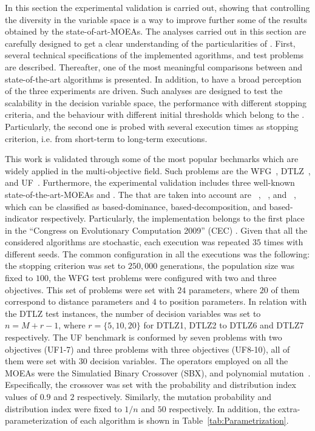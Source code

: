 In this section the experimental validation is carried out, showing that controlling the diversity in the variable space is a way to improve further some of the results obtained by the state-of-art-MOEAs.
%
The analyses carried out in this section are carefully designed to get a clear understanding of the particularities of \VSDMOEA{}.
%
First, several technical specifications of the implemented agorithms, and test problems are described.
%
Thereafter, one of the most meaningful comparisons between \VSDMOEA{} and state-of-the-art algorithms is presented.
%
In addition, to have a broad perception of the \VSDMOEA{} three experiments are driven.
%
Such analyses are designed to test the scalability in the decision variable space, the performance with different stopping criteria, and the behaviour with different initial thresholds which belong to the \VSDMOEA{}.
%
Particularly, the second one is probed with several execution times as stopping criterion, i.e. from short-term to long-term executions.


This work is validated through some of the most popular bechmarks which are widely applied in the multi-objective field.
%
Such problems are the WFG~\cite{Joel:WFG}, DTLZ~\cite{Joel:DTLZ}, and UF~\cite{Joel:CEC2009}.
%
Furthermore, the experimental validation includes three well-known state-of-the-art-MOEAs and \VSDMOEA{}.
%
The \MOEAS{} that are taken into account are \NSGAII{}~\cite{Joel:jMetal}, \MOEAD{}~\cite{MOEADCode}, and \RMOEA{}~\cite{R2EMOACode}, which can be classified as based-dominance, based-decomposition, and based-indicator respectively.
%
Particularly, the \MOEAD{} implementation belongs to the first place in the ``Congress on Evolutionary Computation 2009'' (CEC) \cite{zhang2009performance}.
%
Given that all the considered algorithms are stochastic, each execution was repeated $35$ times with different seeds.
%
The common configuration in all the executions was the following: the stopping criterion was set to $250,000$ generations, the population size was fixed to $100$, the WFG test problems were configured with two and three objectives.
%
This set of problems were set with $24$ parameters, where $20$ of them correspond to distance parameters and $4$ to position parameters.
%
In relation with the DTLZ test instances, the number of decision variables was set to $n=M+r-1$, where $r=\{5, 10, 20\}$ for DTLZ1, DTLZ2 to DTLZ6 and DTLZ7 respectively.
% 
The UF benchmark is conformed by seven problems with two objectives (UF1-7) and three problems with three objectives (UF8-10), all of them were set with $30$ decision variables.
%
The operators employed on all the MOEAs were the Simulatied Binary Crossover (SBX), and polynomial mutation~\cite{Joel:SBX1994, Joel:Mutation}.
%
Especifically, the crossover was set with the probability and distribution index values of $0.9$ and $2$ respectively.
%
Similarly, the mutation probability and distribution index were fixed to $1/n$ and $50$ respectively.
%
In addition, the extra-parameterization of each algorithm is shown in Table~\ref{tab:Parametrization}.


